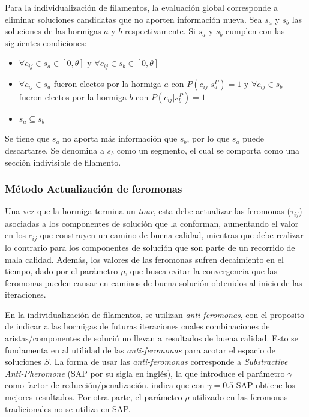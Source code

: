 Para la individualizaci\'on de filamentos, la evaluaci\'on global corresponde a eliminar soluciones candidatas que no aporten informaci\'on nueva. Sea $s_a$ y $s_b$ las soluciones de las hormigas $a$ y $b$ respectivamente. Si $s_a$ y $s_b$ cumplen con las siguientes condiciones:

\begin{itemize}
    \item $\forall c_{ij} \in s_a \in [0, \theta]$ y $\forall c_{ij} \in s_b \in [0, \theta]$
    \item $\forall c_{ij} \in s_a$ fueron electos por la hormiga $a$ con $P(c_{ij} | s_{a}^{P}) = 1$ y $\forall c_{ij} \in s_b$ fueron electos por la hormiga $b$ con $P(c_{ij} | s_{b}^{P}) = 1$
    \item $s_a \subseteq s_b$
\end{itemize}

Se tiene que $s_a$ no aporta m\'as informaci\'on que $s_b$, por lo que $s_a$ puede descartarse. Se denomina a $s_b$ como un segmento, el cual se comporta como una secci\'on indivisible de filamento.

    
\subsubsection{M\'etodo Actualizaci\'on de feromonas}
\label{subsec:pheroUpdate}
Una vez que la hormiga termina un {\it tour}, esta debe actualizar las feromonas ($\tau_{ij}$) asociadas a los componentes de soluci\'on que la conforman, aumentando el valor en los $c_{ij}$ que construyen un camino de buena calidad, mientras que debe realizar lo contrario para los componentes de soluci\'on que son parte de un recorrido de mala calidad. Adem\'as, los valores de las feromonas sufren decaimiento en el tiempo, dado por el par\'ametro $\rho$, que busca evitar la convergencia que las feromonas pueden causar en caminos de buena soluci\'on obtenidos al inicio de las iteraciones.


En la individualizaci\'on de filamentos, se utilizan {\it anti-feromonas}, con el proposito de indicar a las hormigas de futuras iteraciones cuales combinaciones de aristas/componentes de soluci\'n no llevan a resultados de buena calidad. Esto se fundamenta en al utilidad de las {\it anti-feromonas} para acotar el espacio de soluciones $S$. La forma de usar las {\it anti-feromonas} corresponde a {\it Substractive Anti-Pheromone} (SAP por su sigla en ingl\'es), la que introduce el par\'ametro $\gamma$ como factor de reducci\'on/penalizaci\'on. \cite{montgomery2002anti} indica que con $\gamma = 0.5$ SAP obtiene los mejores resultados. Por otra parte, el par\'ametro $\rho$ utilizado en las feromonas tradicionales no se utiliza en SAP.


